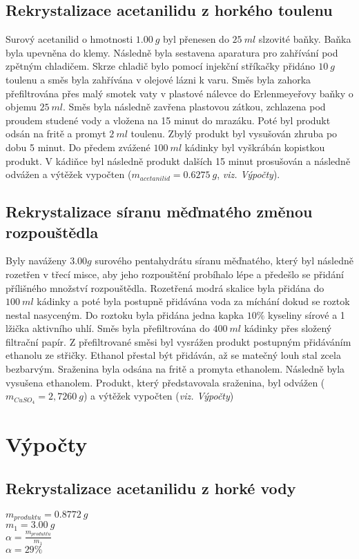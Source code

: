 \documentclass[13pt, a4paper, twoside]{article}
\begin{document}
    \subsection*{Rekrystalizace acetanilidu z horkého toulenu}
    Surový acetanilid o hmotnosti $1.00\: g$ byl přenesen do $25\: ml$ slzovité baňky. Baňka
    byla upevněna do klemy. Následně byla sestavena aparatura pro zahřívání pod zpětným chladičem.
    Skrze chladič bylo pomocí injekční stříkačky přidáno $10 \: g$ toulenu a směs byla zahřívána
    v olejové lázni k varu. Směs byla zahorka přefiltrována přes malý smotek vaty v plastové nálevce
    do Erlenmeyeřovy baňky o objemu $25 \: ml$. Směs byla následně zavřena plastovou zátkou, zchlazena
    pod proudem studené vody a vložena na 15 minut do mrazáku. Poté byl produkt odsán na fritě
    a promyt $2 \: ml$ toulenu. Zbylý produkt byl vysušován zhruba po dobu 5 minut. Do předem
    zvážené $100\: ml$ kádinky byl vyškrábán kopistkou produkt. V kádiňce byl následně produkt
    dalších 15 minut prosušován a následně odvážen a výtěžek vypočten ($m_{acetanilid}=0.6275 \: g$, \emph{viz. Výpočty}).

    \subsection*{Rekrystalizace síranu měďmatého změnou rozpouštědla}
    Byly naváženy $3.00g$ surového pentahydrátu síranu měďnatého, který byl následně rozetřen
    v třecí misce, aby jeho rozpouštění probíhalo lépe a předešlo se přidání přílišného množství
    rozpouštědla. Rozetřená modrá skalice byla přidána do $100 \: ml$ kádinky a poté byla
    postupně přidávána voda za míchání dokud se roztok nestal nasyceným. Do roztoku byla přidána
    jedna kapka $10\%$ kyseliny sírové a 1 lžička aktivního uhlí. Směs byla přefiltrována do $400\: ml$
    kádinky přes složený filtrační papír. Z přefiltrované směsi byl vysrážen produkt postupným
    přidáváním ethanolu ze střičky. Ethanol přestal být přidáván, až se matečný louh stal zcela bezbarvým.
    Sraženina byla odsána na fritě a promyta ethanolem. Následně byla vysušena ethanolem. Produkt, který
    představovala sraženina, byl odvážen ($m_{CuSO_4}=2,7260\: g$)  a výtěžek vypočten (\emph{viz. Výpočty})

    \section*{Výpočty}
    \subsection*{Rekrystalizace acetanilidu z horké vody}
    \begin{multicols}{2}
        \begin{center}
        \noindent$m_{produktu}=0.8772\: g$\\
        $m_1=3.00\:g$\\
        $\alpha=\frac{m_{produktu}}{m_1}$\\
        $\alpha=29\%$
        \end{center}
    \end{multicols}
\end{document}
